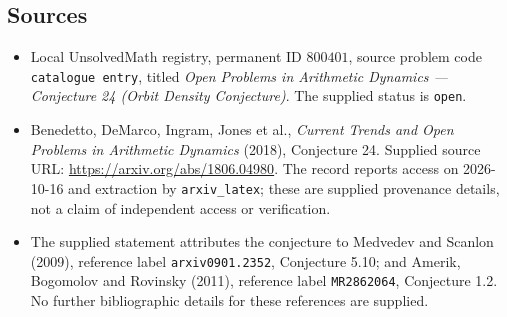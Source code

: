 \documentclass[11pt]{article}
\begin{document}
\subsection{Sources}
\begin{itemize}
\item Local UnsolvedMath registry, permanent ID \(800401\), source problem code \texttt{catalogue entry}, titled \emph{Open Problems in Arithmetic Dynamics --- Conjecture 24 (Orbit Density Conjecture)}. The supplied status is \texttt{open}.
\item Benedetto, DeMarco, Ingram, Jones et al., \emph{Current Trends and Open Problems in Arithmetic Dynamics} (2018), Conjecture 24. Supplied source URL: \url{https://arxiv.org/abs/1806.04980}. The record reports access on 2026-10-16 and extraction by \texttt{arxiv\_latex}; these are supplied provenance details, not a claim of independent access or verification.
\item The supplied statement attributes the conjecture to Medvedev and Scanlon (2009), reference label \texttt{arxiv0901.2352}, Conjecture 5.10; and Amerik, Bogomolov and Rovinsky (2011), reference label \texttt{MR2862064}, Conjecture 1.2. No further bibliographic details for these references are supplied.
\end{itemize}
\end{document}
